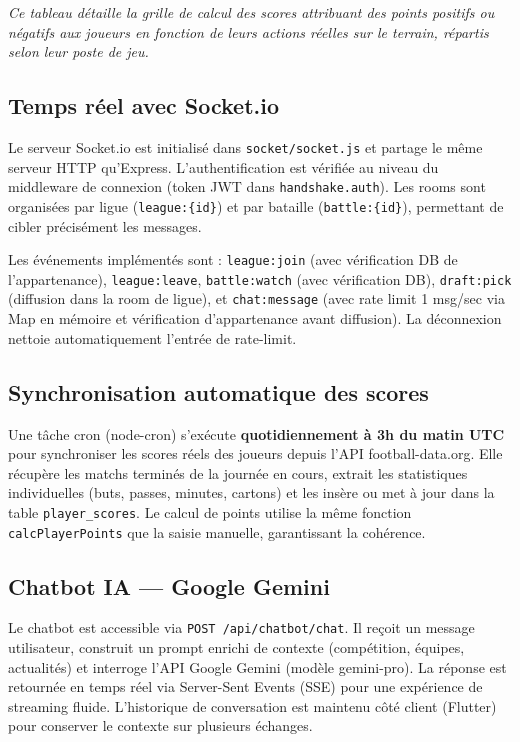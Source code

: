 \vspace{0.2cm}
\noindent\small\textit{Ce tableau détaille la grille de calcul des scores attribuant des points positifs ou négatifs aux joueurs en fonction de leurs actions réelles sur le terrain, répartis selon leur poste de jeu.}\normalsize

\subsection{Temps réel avec Socket.io}

Le serveur Socket.io est initialisé dans \texttt{socket/socket.js} et partage le même serveur HTTP qu'Express. L'authentification est vérifiée au niveau du middleware de connexion (token JWT dans \texttt{handshake.auth}). Les rooms sont organisées par ligue (\texttt{league:\{id\}}) et par bataille (\texttt{battle:\{id\}}), permettant de cibler précisément les messages.

Les événements implémentés sont : \texttt{league:join} (avec vérification DB de l'appartenance), \texttt{league:leave}, \texttt{battle:watch} (avec vérification DB), \texttt{draft:pick} (diffusion dans la room de ligue), et \texttt{chat:message} (avec rate limit 1 msg/sec via Map en mémoire et vérification d'appartenance avant diffusion). La déconnexion nettoie automatiquement l'entrée de rate-limit.

\subsection{Synchronisation automatique des scores}

Une tâche cron (node-cron\cite{node_cron}) s'exécute \textbf{quotidiennement à 3h du matin UTC} pour synchroniser les scores réels des joueurs depuis l'API football-data.org. Elle récupère les matchs terminés de la journée en cours, extrait les statistiques individuelles (buts, passes, minutes, cartons) et les insère ou met à jour dans la table \texttt{player\_scores}. Le calcul de points utilise la même fonction \texttt{calcPlayerPoints} que la saisie manuelle, garantissant la cohérence.

\subsection{Chatbot IA --- Google Gemini}

Le chatbot est accessible via \texttt{POST /api/chatbot/chat}. Il reçoit un message utilisateur, construit un prompt enrichi de contexte (compétition, équipes, actualités) et interroge l'API Google Gemini (modèle gemini-pro). La réponse est retournée en temps réel via Server-Sent Events (SSE) pour une expérience de streaming fluide. L'historique de conversation est maintenu côté client (Flutter) pour conserver le contexte sur plusieurs échanges.

